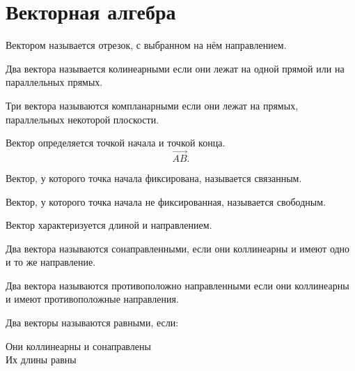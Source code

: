 \section{Векторная алгебра}

\begin{definition}
  Вектором называется отрезок, с выбранном на нём направлением.
\end{definition}

\begin{definition}
  Два вектора называется колинеарными если они лежат на одной прямой или на параллельных прямых.
\end{definition}

\begin{definition}
  Три вектора называются компланарными если они лежат на прямых, параллельных некоторой плоскости.
\end{definition}

\begin{definition}
  Вектор определяется точкой начала и точкой конца.
  \[
    \overrightarrow{AB}
  .\] 
\end{definition}

\begin{definition}
  Вектор, у которого точка начала фиксирована, называется связанным.
\end{definition}

\begin{definition}
  Вектор, у которого точка начала не фиксированная, называется свободным.
\end{definition}

\begin{note}
  Вектор характеризуется длиной и направлением.
\end{note}

\begin{definition}
  Два вектора называются сонаправленными, если они коллинеарны и имеют одно и то же направление.
\end{definition}

\begin{definition}
  Два вектора называются противоположно направленными если они коллинеарны и имеют противоположные направления.
\end{definition}

\begin{definition}
  Два векторы называются равными, если:
  \begin{enumerate}
    Они коллинеарны и сонаправлены \\
    Их длины равны
  \end{enumerate}
\end{definition}

